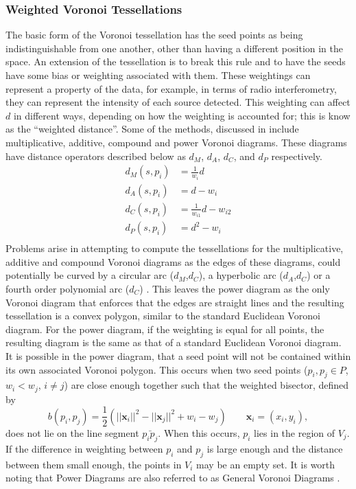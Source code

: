 \subsubsection{Weighted Voronoi Tessellations}\label{tes:ssec:wei}
The basic form of the Voronoi tessellation has the seed points as being indistinguishable from one another, other than having a different position in the space. An extension of the tessellation is to break this rule and to have the seeds have some bias or weighting associated with them. These weightings can represent a property of the data, for example, in terms of radio interferometry, they can represent the intensity of each source detected. This weighting can affect $d$ in different ways, depending on how the weighting is accounted for; this is know as the ``weighted distance''. Some of the methods, discussed in \citep{okabe2009spatial} include multiplicative, additive, compound and power Voronoi diagrams. These diagrams have distance operators described below as $d_M$, $d_A$, $d_C$, and $d_P$ respectively.
%
\begin{equation*}
\begin{aligned}
  d_M(s,p_i) &= \frac{1}{w_i}d			\\
  d_A(s,p_i) &= d - w_i				\\
  d_C(s,p_i) &= \frac{1}{w_{i1}}d - w_{i2}	\\
  d_P(s,p_i) &= d^2 - w_i			\\
\end{aligned}
\end{equation*}
%
Problems arise in attempting to compute the tessellations for the multiplicative, additive and compound Voronoi diagrams as the edges of these diagrams, could potentially be curved by a circular arc ($d_M$,$d_C$), a hyperbolic arc ($d_A$,$d_C$) or a fourth order polynomial arc ($d_C$) \citep{okabe2009spatial}. This leaves the power diagram as the only Voronoi diagram that enforces that the edges are straight lines and the resulting tessellation is a convex polygon, similar to the standard Euclidean Voronoi diagram. For the power diagram, if the weighting is equal for all points, the resulting diagram is the same as that of a standard Euclidean Voronoi diagram. It is possible in the power diagram, that a seed point will not be contained within its own associated Voronoi polygon. This occurs when two seed points ($p_i,p_j \in P$, $w_i<w_j$, $i\neq j$) are close enough together such that the weighted bisector, defined by 
%
\begin{equation}
 b(p_i,p_j) = \frac{1}{2}(||\mathbf{x}_i||^2-||\mathbf{x}_j||^2+w_i-w_j) \qquad \mathbf{x}_i = (x_i,y_i),
\end{equation}
%
does not lie on the line segment $\bar{p_ip_j}$. When this occurs, $p_i$ lies in the region of $V_j$. If the difference in weighting between $p_i$ and $p_j$ is large enough and the distance between them small enough, the points in $V_i$ may be an empty set. It is worth noting that Power Diagrams are also referred to as General Voronoi Diagrams \citep{aurenhammer1987power}.
